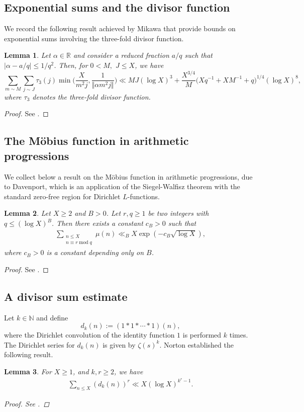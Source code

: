 \documentclass[11pt]{amsart}
\numberwithin{equation}{section}
\numberwithin{figure}{section}
\newtheorem{lemma}{Lemma}[section]
\theoremstyle{definition}
\newcommand{\modu}{\operatorname{mod}}
\begin{document}
\subsection{Exponential sums and the divisor function}
We record the following result achieved by Mikawa that provide bounds on exponential sums involving the three-fold divisor function.
\begin{lemma}\label{lem: Mik}
Let $\alpha\in \mathbb{R}$ and consider a reduced fraction $a/q$ such that $|\alpha-a/q|\leqslant1/q^2$. Then, for $0<M,$ $J\leqslant X $, we have
\[\sum_{m\sim M}\sum_{j\sim J}\tau_{3}(j)\min\bigg(\frac{X}{m^{2}j},\frac{1}{\Vert\alpha m^{2}j\Vert}\bigg) \ll MJ(\log X)^{3}+\dfrac{X^{3/4}}{M}\bigg(Xq^{-1}+XM^{-1}+q\bigg)^{1/4}(\log X)^{8},\]
where $\tau_3$ denotes the three-fold divisor function.
\end{lemma}
\begin{proof}
See \cite{M2000}.
\end{proof}
\subsection{The M\"{o}bius function in arithmetic progressions}
We collect below a result on the M\"{o}bius function in arithmetic progressions, due to Davenport, which is an application of the Siegel-Walfisz theorem with the standard zero-free region for Dirichlet $L$-functions.
\begin{lemma}\label{Davenport}
Let $X\geqslant 2$ and $B>0$. Let $r, q\geqslant 1$ be two integers with $q\leqslant(\log X)^B$. Then there exists a constant $c_B>0$ such that
\begin{align*}
    \sum_{\substack{n \leqslant X \\ n \equiv r \modu q}} \mu(n) \ll_B X\exp(-c_B\sqrt{\log X}),
\end{align*}
where $c_B>0$ is a constant depending only on $B$.
\end{lemma}
\begin{proof}
See \cite[Lemma 6]{D1937}.
\end{proof}
\subsection{A divisor sum estimate} Let $k \in \mathbb{N}$ and define
\[d_k(n) := (1 * 1 *\cdots * 1)(n),\]
where the Dirichlet convolution of the identity function $1$ is performed $k$ times. The Dirichlet series for $d_k(n)$ is given by $\zeta(s)^k$. Norton established the following result.
\begin{lemma}\label{Divisor Sum Powers}
For $X \geqslant 1$, and $k, r \geqslant 2$, we have
\begin{align*}
    \sum_{n \leqslant X } (d_k(n))^r \ll X(\log X)^{k^r-1}.
\end{align*}
\begin{proof}
See \cite[Eq. 1.10]{N1990}.
\end{proof}
\end{lemma}
\end{document}
